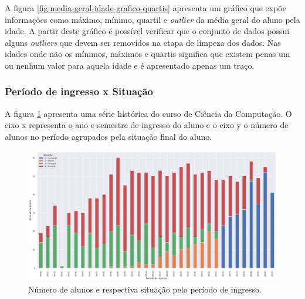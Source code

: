 \documentclass[diss,capa]{texufpel}
\begin{document}
A figura \ref{fig:media-geral-idade-grafico-quartis} apresenta um gráfico que expõe informações como máximo, mínimo, quartil e \textit{outlier} da média geral do aluno pela idade. A partir deste gráfico é possível verificar que o conjunto de dados possui alguns \textit{outliers} que devem ser removidos na etapa de limpeza dos dados. Nas idades onde não os mínimos, máximos e quartis significa que existem penas um ou nenhum valor para aquela idade e é apresentado apenas um traço.




\subsubsection{Período de ingresso x Situação}

A figura \ref{fig:nr-alunos-ano-ingresso} apresenta uma série histórica do curso de Ciência da Computação.
O eixo x representa o ano e semestre de ingresso do aluno e o eixo y o número de alunos no período agrupados pela situação final do aluno.

\begin{figure}[!htbp]
\centering \includegraphics[scale=.32]{imagens/nr-alunos-por-perido-de-ingresso-e-situacao.png}
\caption{Número de alunos e respectiva situação pelo período de ingresso.}
\label{fig:nr-alunos-ano-ingresso}
\end{figure}
\end{document}
